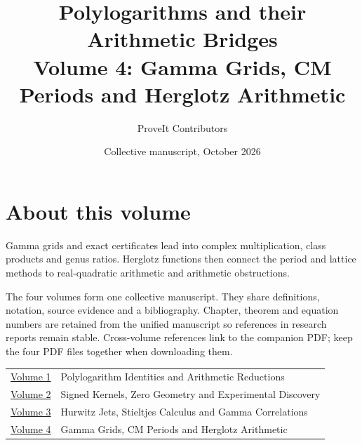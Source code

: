 

\title{Polylogarithms and their Arithmetic Bridges\\[8pt]
\large Volume 4: Gamma Grids, CM Periods and Herglotz Arithmetic}
\author{ProveIt Contributors}
\date{Collective manuscript, October 2026}

\pagestyle{plain}
\frontmatter
\maketitle
\chapter*{About this volume}
Gamma grids and exact certificates lead into complex multiplication, class products and genus ratios. Herglotz functions then connect the period and lattice methods to real-quadratic arithmetic and arithmetic obstructions.

The four volumes form one collective manuscript. They share definitions,
notation, source evidence and a bibliography. Chapter, theorem and equation
numbers are retained from the unified manuscript so references in research
reports remain stable. Cross-volume references link to the companion PDF;
keep the four PDF files together when downloading them.

\begin{center}
\begin{tabular}{@{}p{0.8in}p{5.5in}@{}}
\href{volume-1-polylogarithm-identities.pdf}{Volume 1} & Polylogarithm Identities and Arithmetic Reductions \\
\href{volume-2-signed-kernels.pdf}{Volume 2} & Signed Kernels, Zero Geometry and Experimental Discovery \\
\href{volume-3-hurwitz-stieltjes.pdf}{Volume 3} & Hurwitz Jets, Stieltjes Calculus and Gamma Correlations \\
\href{volume-4-cm-and-herglotz.pdf}{Volume 4} & Gamma Grids, CM Periods and Herglotz Arithmetic \\
\end{tabular}
\end{center}


